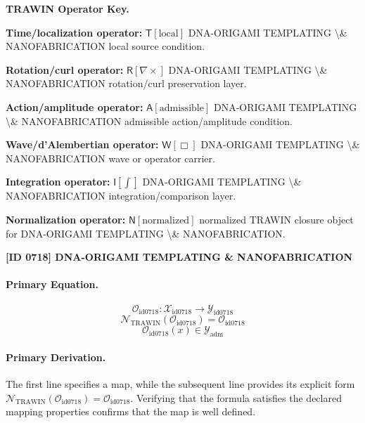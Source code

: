 \par\vspace{0.45\baselineskip}
\noindent\begin{minipage}[t]{\linewidth}
\begingroup
\small
\raggedright
\textbf{TRAWIN Operator Key.}\par
\noindent\textbf{Time/localization operator:} $\mathsf{T}\!\left[\mathrm{local}\right]$ DNA-ORIGAMI TEMPLATING \textbackslash{}\& NANOFABRICATION local source condition.\par
\noindent\textbf{Rotation/curl operator:} $\mathsf{R}\!\left[\nabla\times\right]$ DNA-ORIGAMI TEMPLATING \textbackslash{}\& NANOFABRICATION rotation/curl preservation layer.\par
\noindent\textbf{Action/amplitude operator:} $\mathsf{A}\!\left[\mathrm{admissible}\right]$ DNA-ORIGAMI TEMPLATING \textbackslash{}\& NANOFABRICATION admissible action/amplitude condition.\par
\noindent\textbf{Wave/d'Alembertian operator:} $\mathsf{W}\!\left[\Box\right]$ DNA-ORIGAMI TEMPLATING \textbackslash{}\& NANOFABRICATION wave or operator carrier.\par
\noindent\textbf{Integration operator:} $\mathsf{I}\!\left[\int\right]$ DNA-ORIGAMI TEMPLATING \textbackslash{}\& NANOFABRICATION integration/comparison layer.\par
\noindent\textbf{Normalization operator:} $\mathsf{N}\!\left[\mathrm{normalized}\right]$ normalized TRAWIN closure object for DNA-ORIGAMI TEMPLATING \textbackslash{}\& NANOFABRICATION.\par
\endgroup
\end{minipage}

\clearpage
\noindent\textbf{[ID 0718] DNA-ORIGAMI TEMPLATING \& NANOFABRICATION}\par
\vspace{0.35em}
\paragraph{Primary Equation.}
\[
\mathcal{O}_{\mathrm{id0718}}:\mathcal{X}_{\mathrm{id0718}}\longrightarrow\mathcal{Y}_{\mathrm{id0718}}
\]
\[
\mathcal{N}_{\mathrm{TRAWIN}}(\mathcal{O}_{\mathrm{id0718}})=\mathcal{O}_{\mathrm{id0718}}
\]
\[
\mathcal{O}_{\mathrm{id0718}}(x)\in\mathcal{Y}_{\mathrm{adm}}
\]

\paragraph{Primary Derivation.}
The first line specifies a map, while the subsequent line provides its explicit form \( \mathcal{N}_{\mathrm{TRAWIN}}(\mathcal{O}_{\mathrm{id0718}})=\mathcal{O}_{\mathrm{id0718}} \). Verifying that the formula satisfies the declared mapping properties confirms that the map is well defined.
